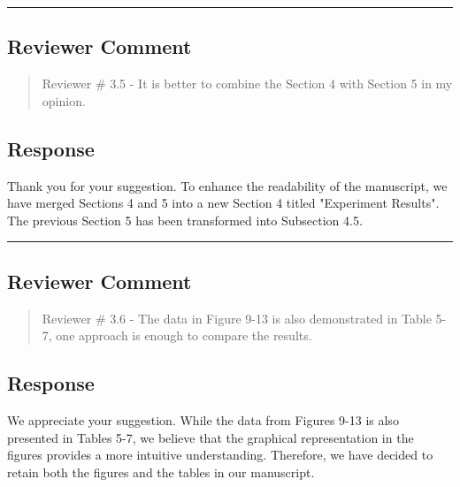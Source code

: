 \noindent\rule{\linewidth}{2.0pt}

\subsection{Reviewer Comment}
\begin{mdframed}
	\begin{quote}
		Reviewer \# 3.5 - It is better to combine the Section 4 with Section 5 in my opinion.
	\end{quote}
\end{mdframed}

\subsection{Response}

Thank you for your suggestion. To enhance the readability of the manuscript, we have merged Sections 4 and 5 into a new Section 4 titled "Experiment Results". The previous Section 5 has been transformed into Subsection 4.5.

\noindent\rule{\linewidth}{2.0pt}

\subsection{Reviewer Comment}
\begin{mdframed}
	\begin{quote}
		Reviewer \# 3.6 - The data in Figure 9-13 is also demonstrated in Table 5-7, one approach is enough to compare the results.
	\end{quote}
\end{mdframed}

\subsection{Response}

We appreciate your suggestion. While the data from Figures 9-13 is also presented in Tables 5-7, we believe that the graphical representation in the figures provides a more intuitive understanding. Therefore, we have decided to retain both the figures and the tables in our manuscript.

